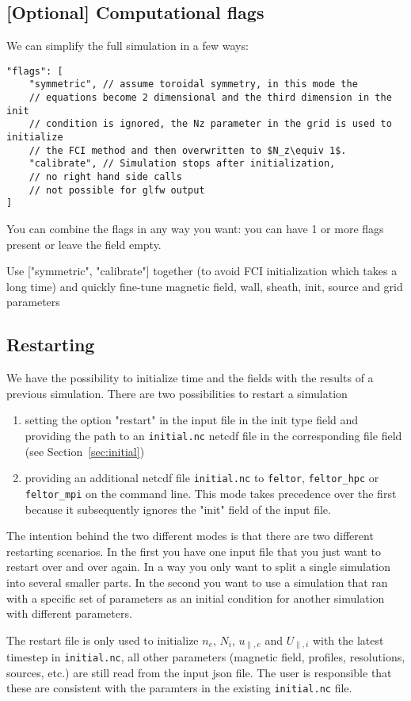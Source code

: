 \subsection{[Optional] Computational flags}
We can simplify the full simulation in a few ways:
\begin{verbatim}
"flags": [
    "symmetric", // assume toroidal symmetry, in this mode the
    // equations become 2 dimensional and the third dimension in the init
    // condition is ignored, the Nz parameter in the grid is used to initialize
    // the FCI method and then overwritten to $N_z\equiv 1$.
    "calibrate", // Simulation stops after initialization,
    // no right hand side calls
    // not possible for glfw output
]
\end{verbatim}
You can combine the flags in any way you want: you can have 1 or more
flags present or leave the field empty.
\begin{tcolorbox}[title=Note]
    Use ["symmetric", "calibrate"] together (to avoid FCI initialization
    which takes a long time) and quickly fine-tune
    magnetic field, wall, sheath, init, source and grid parameters
\end{tcolorbox}
\subsection{Restarting} \label{sec:restart}
We have the possibility to initialize time and
the fields with the results of a previous simulation.
There are two possibilities to restart a simulation
\begin{enumerate}
    \item setting the option "restart" in the input file in the init type field
        and providing the path to an \texttt{initial.nc} netcdf file in the
        corresponding file field (see Section~\ref{sec:initial})
    \item providing an additional netcdf file \texttt{initial.nc}
        to \texttt{feltor}, \texttt{feltor_hpc} or \texttt{feltor_mpi} on the
        command line. This mode takes precedence over the first because it
        subsequently ignores the "init" field of the input file.
\end{enumerate}
The intention behind the two different modes is that there are two different
restarting scenarios. In the first you have one input file that you just want
to restart over and over again. In a way you only want to split a single
simulation into several smaller parts. In the second you want to use a
simulation that ran with a specific set of parameters as an initial condition
for another simulation with different parameters.
\begin{tcolorbox}[title=Note]
    The restart file is only used to initialize $n_e$, $N_i$, $u_{\parallel,e}$
    and $U_{\parallel,i}$ with the latest timestep in \texttt{initial.nc}, all
    other parameters (magnetic field, profiles, resolutions, sources, etc.)
    are still read from the input json file.  The user is responsible
    that these are consistent with the paramters in the existing
    \texttt{initial.nc} file.
\end{tcolorbox}

